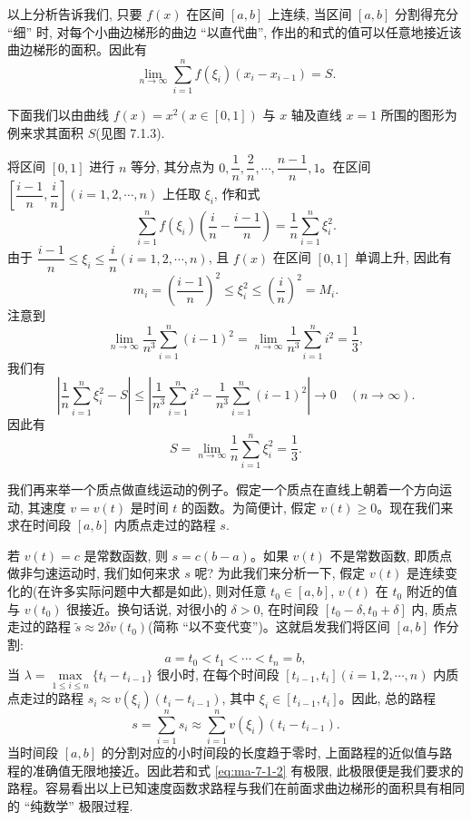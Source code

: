 以上分析告诉我们, 只要 $f(x)$ 在区间 $[a,b]$ 上连续, 当区间 $[a,b]$ 分割得充分 ``细'' 时, 对每个小曲边梯形的曲边 ``以直代曲'', 作出的和式的值可以任意地接近该曲边梯形的面积。因此有
\[
  \lim_{n\to\infty}\sum_{i=1}^n f(\xi_i)(x_i-x_{i-1})=S.
\]

下面我们以由曲线 $f(x)=x^2(x\in[0,1])$ 与 $x$ 轴及直线 $x=1$ 所围的图形为例来求其面积 $S$(见图 7.1.3).

将区间 $[0,1]$ 进行 $n$ 等分, 其分点为 $0,\dfrac1n,\dfrac2n,\cdots,\dfrac{n-1}{n},1$。在区间 $\left[\dfrac{i-1}{n},\dfrac{i}{n}\right](i=1,2,\cdots,n)$ 上任取 $\xi_i$, 作和式
\[
  \sum_{i=1}^n f(\xi_i)\left(\frac{i}{n}-\frac{i-1}{n}\right)
  =\frac1n\sum_{i=1}^n \xi_i^2.
\]
由于 $\dfrac{i-1}{n}\leq \xi_i\leq \dfrac{i}{n}(i=1,2,\cdots,n)$, 且 $f(x)$ 在区间 $[0,1]$ 单调上升, 因此有
\[
  m_i=\left(\frac{i-1}{n}\right)^2\leq \xi_i^2\leq \left(\frac{i}{n}\right)^2=M_i.
\]
注意到
\[
  \lim_{n\to\infty}\frac1{n^3}\sum_{i=1}^n (i-1)^2
  =\lim_{n\to\infty}\frac1{n^3}\sum_{i=1}^n i^2
  =\frac13,
\]
我们有
\[
  \left|\frac1n\sum_{i=1}^n \xi_i^2-S\right|
  \leq \left|\frac1{n^3}\sum_{i=1}^n i^2-\frac1{n^3}\sum_{i=1}^n (i-1)^2\right|
  \to 0\quad(n\to\infty).
\]
因此有
\[
  S=\lim_{n\to\infty}\frac1n\sum_{i=1}^n \xi_i^2=\frac13.
\]

我们再来举一个质点做直线运动的例子。假定一个质点在直线上朝着一个方向运动, 其速度 $v=v(t)$ 是时间 $t$ 的函数。为简便计, 假定 $v(t)\geq 0$。现在我们来求在时间段 $[a,b]$ 内质点走过的路程 $s$.

若 $v(t)=c$ 是常数函数, 则 $s=c(b-a)$。如果 $v(t)$ 不是常数函数, 即质点做非匀速运动时, 我们如何来求 $s$ 呢? 为此我们来分析一下, 假定 $v(t)$ 是连续变化的(在许多实际问题中大都是如此), 则对任意 $t_0\in[a,b]$, $v(t)$ 在 $t_0$ 附近的值与 $v(t_0)$ 很接近。换句话说, 对很小的 $\delta>0$, 在时间段 $[t_0-\delta,t_0+\delta]$ 内, 质点走过的路程 $\tilde s\approx 2\delta v(t_0)$(简称 ``以不变代变'')。这就启发我们将区间 $[a,b]$ 作分割:
\[
  a=t_0<t_1<\cdots<t_n=b,
\]
当 $\lambda=\max\limits_{1\leq i\leq n}\{t_i-t_{i-1}\}$ 很小时, 在每个时间段 $[t_{i-1},t_i](i=1,2,\cdots,n)$ 内质点走过的路程 $s_i\approx v(\xi_i)(t_i-t_{i-1})$, 其中 $\xi_i\in[t_{i-1},t_i]$。因此, 总的路程
\begin{equation}
  s=\sum_{i=1}^n s_i\approx \sum_{i=1}^n v(\xi_i)(t_i-t_{i-1}).
  \label{eq:ma-7-1-2}
\end{equation}
当时间段 $[a,b]$ 的分割对应的小时间段的长度趋于零时, 上面路程的近似值与路程的准确值无限地接近。因此若和式 \eqref{eq:ma-7-1-2} 有极限, 此极限便是我们要求的路程。容易看出以上已知速度函数求路程与我们在前面求曲边梯形的面积具有相同的 ``纯数学'' 极限过程.

